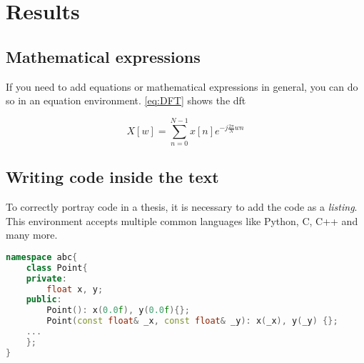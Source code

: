 \chapter{Results}
\label{chap:5_results}

\lipsum[2-4]

\section{Mathematical expressions}

If you need to add equations or mathematical expressions in general, you can do so in an equation environment. \autoref{eq:DFT} shows the \gls{dft} 


\begin{equation}
    \label{eq:DFT}
    X[w] = \sum_{n = 0}^{N-1}x[n]e^{-j\frac{2\pi}{N}wn}
\end{equation}

\section{Writing code inside the text}

To correctly portray code in a thesis, it is necessary to add the code as a \textit{listing}. This environment accepts multiple common languages like Python, C, C++ and many more. 

\begin{lstlisting}[language=C++, caption=C++ example]
namespace abc{
    class Point{
    private:
        float x, y;
    public:
        Point(): x(0.0f), y(0.0f){};
        Point(const float& _x, const float& _y): x(_x), y(_y) {};
    ...
    };
}
\end{lstlisting}